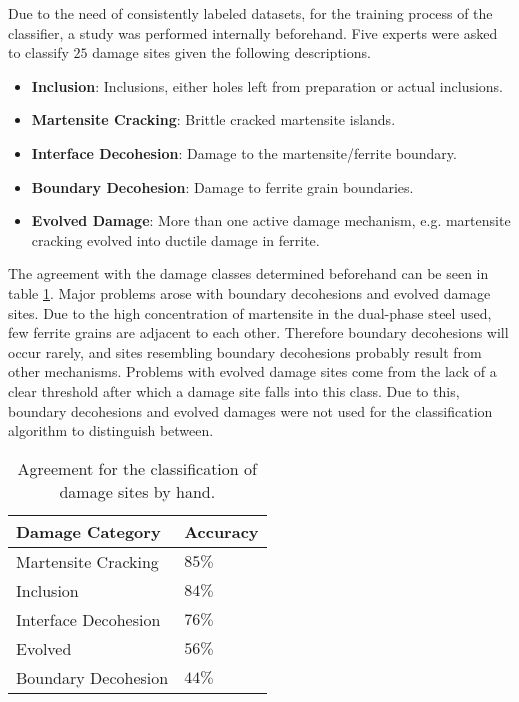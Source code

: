 Due to the need of consistently labeled datasets, for the training process of the classifier, a study was performed internally beforehand. Five experts were asked to classify $25$ damage sites given the following descriptions. 
\begin{itemize}[label={}]
\item \textbf{Inclusion}: Inclusions, either holes left from preparation or actual inclusions.
\item \textbf{Martensite Cracking}: Brittle cracked martensite islands.
\item \textbf{Interface Decohesion}: Damage to the martensite/ferrite boundary.
\item \textbf{Boundary Decohesion}: Damage to ferrite grain boundaries.
\item \textbf{Evolved Damage}: More than one active damage mechanism, e.g. martensite cracking evolved into ductile damage in ferrite.
\end{itemize}
The agreement with the damage classes determined beforehand can be seen in table \ref{tab:Reliability}. Major problems arose with boundary decohesions and evolved damage sites. Due to the high concentration of martensite in the dual-phase steel used, few ferrite grains are adjacent to each other. Therefore boundary decohesions will occur rarely, and sites resembling boundary decohesions probably result from other mechanisms. Problems with evolved damage sites come from the lack of a clear threshold after which a damage site falls into this class. Due to this, boundary decohesions and evolved damages were not used for the classification algorithm to distinguish between.\\

\begin{table}[H]
 \begin{center}
  \begin{tabular}{@{} *2l @{}} \toprule[2pt]
   Damage Category & Accuracy \\\midrule
   Martensite Cracking & $85 \%$   \\ 
   Inclusion  & $84 \%$ \\ 
   Interface Decohesion  & $76 \% $ \\
   Evolved & $56\%$ \\
   Boundary Decohesion & $44 \%$ \\ \bottomrule[2pt]

  \end{tabular}
 \end{center}
 \caption{Agreement for the classification of damage sites by hand. }
 \label{tab:Reliability}
\end{table}

